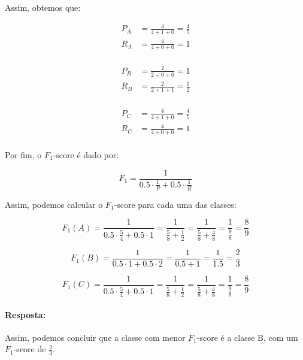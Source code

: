 \documentclass{article}
\begin{document}
Assim, obtemos que:
\begin{center}
  \begin{minipage}{0.3\textwidth}
    \begin{align*}
      P_A &= \frac{4}{4 + 1 + 0} = \frac{4}{5} \\
      R_A &= \frac{4}{4 + 0 + 0} = 1 \\
    \end{align*}
  \end{minipage}
  \begin{minipage}{0.3\textwidth}
    \begin{align*}
      P_B &= \frac{2}{2 + 0 + 0} = 1 \\
      R_B &= \frac{2}{2 + 1 + 1} = \frac{1}{2} \\
    \end{align*}
  \end{minipage}
  \begin{minipage}{0.3\textwidth}
    \begin{align*}
      P_C &= \frac{4}{4 + 1 + 0} = \frac{4}{5} \\
      R_C &= \frac{4}{4 + 0 + 0} = 1 \\
    \end{align*}
  \end{minipage}
\end{center}

Por fim, o $F_1$-score é dado por:

\[ F_1 = \frac{1}{0.5\cdot \frac{1}{P} + 0.5\cdot \frac{1}{R}} \]

Assim, podemos calcular o $F_1$-score para cada uma das classes:

\[ F_1(A) = \frac{1}{0.5\cdot \frac{5}{4} + 0.5\cdot 1} = \frac{1}{\frac{5}{8} + \frac{1}{2}} = \frac{1}{\frac{5}{8} + \frac{4}{8}} = \frac{1}{\frac{9}{8}} = \frac{8}{9} \]

\[ F_1(B) = \frac{1}{0.5\cdot 1 + 0.5\cdot 2} = \frac{1}{0.5 + 1} = \frac{1}{1.5} = \frac{2}{3} \]

\[ F_1(C) = \frac{1}{0.5\cdot \frac{5}{4} + 0.5\cdot 1} = \frac{1}{\frac{5}{8} + \frac{1}{2}} = \frac{1}{\frac{5}{8} + \frac{4}{8}} = \frac{1}{\frac{9}{8}} = \frac{8}{9} \]

\paragraph{Resposta: }
Assim, podemos concluir que a classe com menor $F_1$-score é a classe B, com um $F_1$-score de $\frac{2}{3}$.
\end{document}
